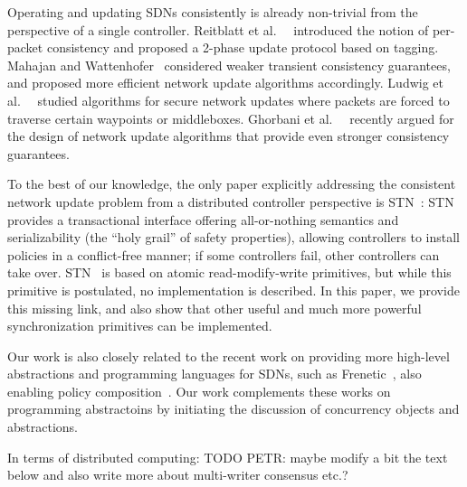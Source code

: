 \documentclass[conference]{sigcomm-alternate}
\begin{document}
Operating and updating SDNs consistently is already non-trivial
from the perspective of a single controller. Reitblatt et al.~~\cite{network-update}
introduced the notion of
per-packet consistency and proposed a 2-phase update protocol based on tagging.
Mahajan and Wattenhofer~\cite{roger-hotnets} considered weaker transient
consistency guarantees, and proposed more efficient network update algorithms
accordingly. Ludwig et al.~~\cite{hotnets14update} studied algorithms for secure
network updates where packets are forced to traverse certain waypoints or
middleboxes. Ghorbani et al.~~\cite{correct-virt} recently argued for the design
of network update algorithms that provide even stronger consistency guarantees.

To the best of our knowledge, the only paper explicitly addressing the consistent
network update problem from a distributed controller perspective is STN~\cite{stn}:
STN provides a transactional interface offering all-or-nothing semantics and serializability
(the ``holy grail'' of safety properties),
allowing
controllers to install policies in a conflict-free manner; if some controllers fail,
other controllers can take over. STN~\cite{stn} is based on
atomic
read-modify-write primitives, but while this primitive is postulated, no implementation is
described. In this paper, we provide this missing link, and also show that other useful and
much more powerful synchronization primitives can be implemented.

Our work is also closely related to the recent work on providing more high-level
abstractions and programming languages for SDNs, such as Frenetic~\cite{frenetic},
also enabling policy composition~\cite{pyretic}. Our work complements these works
on programming abstractoins
by initiating the discussion of concurrency objects and abstractions.

In terms of distributed computing: TODO PETR: maybe modify a bit the text below
and also write more about multi-writer consensus etc.?
\end{document}
